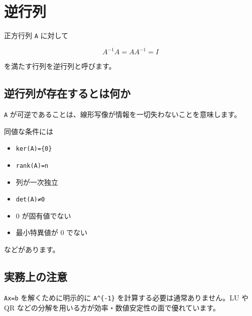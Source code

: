 \documentclass[
  11pt,
  a4paper,
]{ltjsarticle}
\author{}
\date{}
\providecommand{\tightlist}{%
  \setlength{\itemsep}{0pt}\setlength{\parskip}{0pt}}
\begin{document}
\hypertarget{ux9006ux884cux5217}{%
\section{逆行列}\label{ux9006ux884cux5217}}

正方行列 \texttt{A} に対して

\[
A^{-1}A=AA^{-1}=I
\]

を満たす行列を逆行列と呼びます。

\hypertarget{ux9006ux884cux5217ux304cux5b58ux5728ux3059ux308bux3068ux306fux4f55ux304b}{%
\subsection{逆行列が存在するとは何か}\label{ux9006ux884cux5217ux304cux5b58ux5728ux3059ux308bux3068ux306fux4f55ux304b}}

\texttt{A}
が可逆であることは、線形写像が情報を一切失わないことを意味します。

同値な条件には

\begin{itemize}
\tightlist
\item
  \texttt{ker(A)=\{0\}}
\item
  \texttt{rank(A)=n}
\item
  列が一次独立
\item
  \texttt{det(A)≠0}
\item
  0 が固有値でない
\item
  最小特異値が 0 でない
\end{itemize}

などがあります。

\hypertarget{ux5b9fux52d9ux4e0aux306eux6ce8ux610f}{%
\subsection{実務上の注意}\label{ux5b9fux52d9ux4e0aux306eux6ce8ux610f}}

\texttt{Ax=b} を解くために明示的に \texttt{A\^{}\{-1\}}
を計算する必要は通常ありません。LU や QR
などの分解を用いる方が効率・数値安定性の面で優れています。
\end{document}
